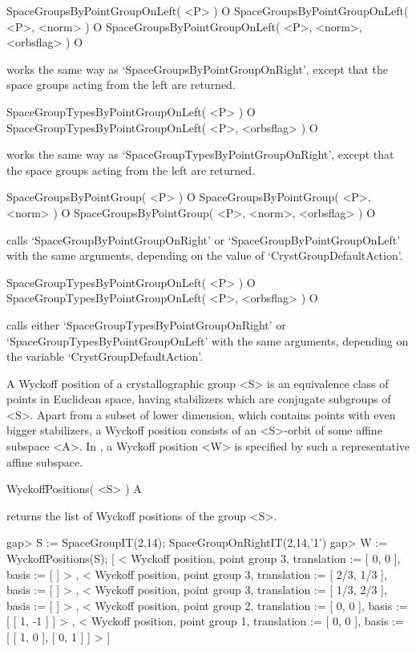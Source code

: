 \>SpaceGroupsByPointGroupOnLeft( <P> ) O
\>SpaceGroupsByPointGroupOnLeft( <P>, <norm> ) O
\>SpaceGroupsByPointGroupOnLeft( <P>, <norm>, <orbsflag> ) O

works the same way as `SpaceGroupsByPointGroupOnRight', except that
the space groups acting from the left are returned.

\>SpaceGroupTypesByPointGroupOnLeft( <P> ) O
\>SpaceGroupTypesByPointGroupOnLeft( <P>, <orbsflag> ) O

works the same way as `SpaceGroupTypesByPointGroupOnRight', except that
the space groups acting from the left are returned.

\>SpaceGroupsByPointGroup( <P> ) O
\>SpaceGroupsByPointGroup( <P>, <norm> ) O
\>SpaceGroupsByPointGroup( <P>, <norm>, <orbsflag> ) O

calls `SpaceGroupByPointGroupOnRight' or `SpaceGroupByPointGroupOnLeft' 
with the same arguments, depending on the value of `CrystGroupDefaultAction'.

\>SpaceGroupTypesByPointGroupOnLeft( <P> ) O
\>SpaceGroupTypesByPointGroupOnLeft( <P>, <orbsflag> ) O

calls either `SpaceGroupTypesByPointGroupOnRight' or
`SpaceGroupTypesByPointGroupOnLeft' with the same arguments, depending
on the variable `CrystGroupDefaultAction'.


A Wyckoff position of a crystallographic group <S> is an equivalence class of
points in Euclidean space, having stabilizers which are conjugate
subgroups of <S>.  Apart from a subset of lower dimension, which
contains points with even bigger stabilizers, a Wyckoff position
consists of an <S>-orbit of some affine subspace <A>. In {\Cryst},
a Wyckoff position <W> is specified by such a representative affine
subspace.

\>WyckoffPositions( <S> ) A

returns the list of Wyckoff positions of the group <S>.

\beginexample
gap> S := SpaceGroupIT(2,14);
SpaceGroupOnRightIT(2,14,'1')
gap> W := WyckoffPositions(S);
[ < Wyckoff position, point group 3, translation := [ 0, 0 ], 
    basis := [  ] >
    , < Wyckoff position, point group 3, translation := [ 2/3, 1/3 ], 
    basis := [  ] >
    , < Wyckoff position, point group 3, translation := [ 1/3, 2/3 ], 
    basis := [  ] >
    , < Wyckoff position, point group 2, translation := [ 0, 0 ], 
    basis := [ [ 1, -1 ] ] >
    , < Wyckoff position, point group 1, translation := [ 0, 0 ], 
    basis := [ [ 1, 0 ], [ 0, 1 ] ] >
     ]
\endexample

